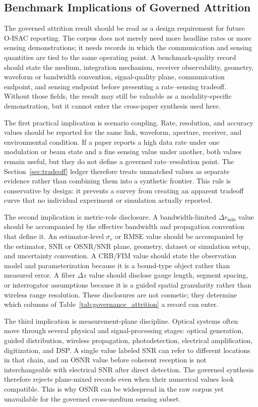 \documentclass[letterpaper,journal]{IEEEtran}
\begin{document}
\subsection{Benchmark Implications of Governed Attrition}

The governed attrition result should be read as a design requirement for future O-ISAC reporting. The corpus does not merely need more headline rates or more sensing demonstrations; it needs records in which the communication and sensing quantities are tied to the same operating point. A benchmark-quality record should state the medium, integration mechanism, receiver observability, geometry, waveform or bandwidth convention, signal-quality plane, communication endpoint, and sensing endpoint before presenting a rate--sensing tradeoff. Without those fields, the result may still be valuable as a modality-specific demonstration, but it cannot enter the cross-paper synthesis used here.

The first practical implication is scenario coupling. Rate, resolution, and accuracy values should be reported for the same link, waveform, aperture, receiver, and environmental condition. If a paper reports a high data rate under one modulation or beam state and a fine sensing value under another, both values remain useful, but they do not define a governed rate--resolution point. The Section~\ref{sec:tradeoff} ledger therefore treats unmatched values as separate evidence rather than combining them into a synthetic frontier. This rule is conservative by design: it prevents a survey from creating an apparent tradeoff curve that no individual experiment or simulation actually reported.

The second implication is metric-role disclosure. A bandwidth-limited $\Delta r_{\min}$ value should be accompanied by the effective bandwidth and propagation convention that define it. An estimator-level $\sigma_r$ or RMSE value should be accompanied by the estimator, SNR or OSNR/SNR plane, geometry, dataset or simulation setup, and uncertainty convention. A CRB/FIM value should state the observation model and parameterization because it is a bound-type object rather than measured error. A fiber $\Delta z$ value should disclose gauge length, segment spacing, or interrogator assumptions because it is a guided spatial granularity rather than wireless range resolution. These disclosures are not cosmetic; they determine which columns of Table~\ref{tab:governance_attrition} a record can enter.

The third implication is measurement-plane discipline. Optical systems often move through several physical and signal-processing stages: optical generation, guided distribution, wireless propagation, photodetection, electrical amplification, digitization, and DSP. A single value labeled SNR can refer to different locations in that chain, and an OSNR value before coherent reception is not interchangeable with electrical SNR after direct detection. The governed synthesis therefore rejects plane-mixed records even when their numerical values look compatible. This is why OSNR can be widespread in the raw corpus yet unavailable for the governed cross-medium sensing subset.
\end{document}
